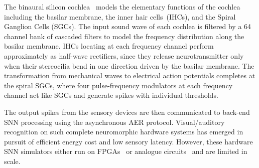 The binaural silicon cochlea~\citep{5537164} models the elementary functions of the cochlea including the basilar membrane, the inner hair cells~(IHCs), and the Spiral Ganglion Cells (SGCs).
The input sound wave of each cochlea is filtered by a 64 channel bank of cascaded filters to model the frequency distribution along the basilar membrane.
IHCs locating at each frequency channel perform approximately as half-wave rectifiers, since they release neurotransmitter only when their stereocilia bend in one direction driven by the basilar membrane.
The transformation from mechanical waves to electrical action potentials completes at the spiral SGCs, where four pulse-frequency modulators at each frequency channel act like SGCs and generate spikes with individual thresholds.


The output spikes from the sensory devices are then communicated to back-end SNN processing using the asynchronous AER protocol.
Visual/auditory recognition on such complete neuromorphic hardware systems has emerged in pursuit of efficient energy cost and low sensory latency.
However, these hardware SNN simulators either run on FPGAs~\citep{neil2014minitaur, kiselev2016event} or analogue circuits~\citep{qiao2015reconfigurable} and are limited in scale.

